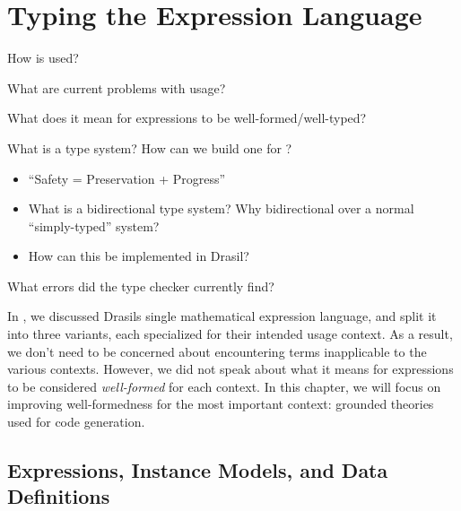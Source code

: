 \chapter{Typing the Expression Language}
\label{chap:typed-expr}

\begin{writingdirectives}
      \item How is \Expr{} used?
      \item What are current problems with \Expr{} usage?
      \item What does it mean for expressions to be well-formed/well-typed?
      \item What is a type system? How can we build one for \Expr{}?
            \begin{itemize}
                  \item ``Safety = Preservation + Progress'' \cite{Harper2016}
                  \item What is a bidirectional type system? Why bidirectional
                        over a normal ``simply-typed'' system?
                  \item How can this be implemented in Drasil?
            \end{itemize}
      \item What errors did the type checker currently find?
\end{writingdirectives}

In , we discussed Drasils single mathematical
expression language, and split it into three variants, each specialized for
their intended usage context. As a result, we don't need to be concerned about
encountering terms inapplicable to the various contexts. However, we did not
speak about what it means for expressions to be considered \textit{well-formed}
for each context. In this chapter, we will focus on improving well-formedness
for the most important context: grounded theories used for code generation.

\section{Expressions, Instance Models, and Data Definitions}
\label{chap:typed-expr:sec:expressions-instance-models-and-data-definitions}

